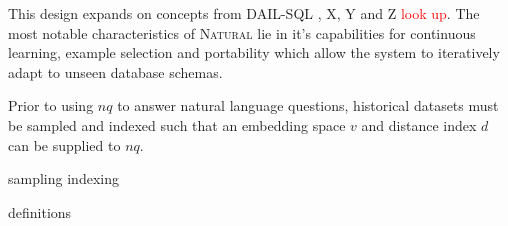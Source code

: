 This design expands on concepts from DAIL-SQL \citep{DAIL}, X, Y and Z \textcolor{red}{look up}.
The most notable characteristics of \textsc{Natural} lie in it's capabilities for continuous
learning, example selection and portability which allow the system to iteratively
adapt to unseen database schemas.

Prior to using $nq$ to answer natural language questions, historical datasets must be sampled
and indexed such that an embedding space $v$ and distance index $d$ can be supplied to $nq$.

{sampling}
{indexing}

{definitions}

